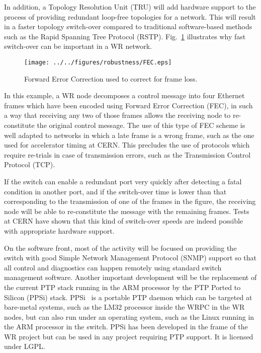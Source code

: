 \documentclass{../JAC2003}
\begin{document}
In addition, a Topology Resolution Unit (TRU) will add hardware
support to the process of providing redundant loop-free topologies for
a network. This will result in a faster topology switch-over compared
to traditional software-based methods such as the Rapid Spanning Tree
Protocol (RSTP). Fig.~\ref{fec-fig} illustrates why fast switch-over
can be important in a WR network.

\begin{figure}[htb]
   \centering
   \texttt{[image: ../../figures/robustness/FEC.eps]}
   \caption{Forward Error Correction used to correct for frame loss.}
   \label{fec-fig}
\end{figure}

In this example, a WR node decomposes a control message into four
Ethernet frames which have been encoded using Forward Error Correction
(FEC), in such a way that receiving any two of those frames allows the
receiving node to re-constitute the original control message. The use
of this type of FEC scheme is well adapted to networks in which a late
frame is a wrong frame, such as the one used for accelerator timing at
CERN. This precludes the use of protocols which require re-trials in
case of transmission errors, such as the Transmission Control Protocol
(TCP).

If the switch can enable a redundant port very quickly after detecting
a fatal condition in another port, and if the switch-over time is
lower than that corresponding to the transmission of one of the frames
in the figure, the receiving node will be able to re-constitute the
message with the remaining frames. Tests at CERN have shown that this
kind of switch-over speeds are indeed possible with appropriate
hardware support.

On the software front, most of the activity will be focused on
providing the switch with good Simple Network Management Protocol
(SNMP) support so that all control and diagnostics can happen remotely
using standard switch management software. Another important
development will be the replacement of the current PTP stack running
in the ARM processor by the PTP Ported to Silicon (PPSi)
stack. PPSi~\cite{ppsi-ref} is a portable PTP daemon which can be
targeted at bare-metal systems, such as the LM32 processor inside the
WRPC in the WR nodes, but can also run under an operating system, such
as the Linux running in the ARM processor in the switch. PPSi has been
developed in the frame of the WR project but can be used in any
project requiring PTP support. It is licensed under LGPL. 
\end{document}
